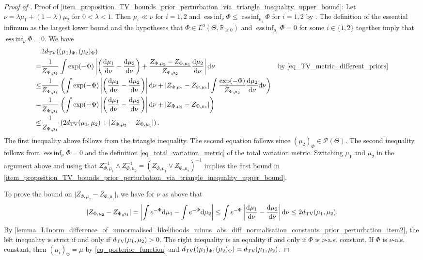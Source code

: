 \documentclass[a4paper]{scrartcl}
\theoremstyle{definition}
\numberwithin{equation}{section}
\newcommand{\R}{\mathbb{R}}
\newcommand{\rd}{\mathrm{d}}
\DeclareMathOperator*{\essinf}{ess\,inf}
\newcommand{\abs}[1]{\vert #1\vert}
\newcommand{\Abs}[1]{\left\vert#1\right\vert}
\newcommand{\TV}[0]{\textup{TV}}
\begin{document}
\begin{proof}[Proof of ]
 Proof of \cref{item_proposition_TV_bounds_prior_perturbation_via_triangle_inequality_upper_bound}: 
 Let $\nu=\lambda \mu_1+(1-\lambda)\mu_2$ for $0<\lambda <1$. Then $\mu_i\ll\nu$ for $i=1,2$ and $\essinf_\nu\Phi\leq \essinf_{\mu_i}\Phi$ for $i=1,2$ by .
 The definition of the essential infimum as the largest lower bound and the hypotheses that $\Phi\in L^0(\Theta,\R_{\geq 0})$ and $\essinf_{\mu_i}\Phi=0$ for some $i\in\{1,2\}$ together imply that $\essinf_\nu \Phi=0$.
 We have
\begin{align*}
  &2d_{\TV}((\mu_1)_\Phi,(\mu_2)_\Phi)
 \\
 =& \frac{1}{Z_{\Phi,\mu_1}}\int \exp(-\Phi) \Abs{ \left(\frac{\rd \mu_1}{\rd \nu}-\frac{\rd \mu_2}{\rd \nu}\right)+\frac{Z_{\Phi,\mu_2}-Z_{\Phi,\mu_1}}{Z_{\Phi,\mu_2}} \frac{\rd \mu_2}{\rd \nu}}\rd \nu  & \text{by \eqref{eq_TV_metric_different_priors}}
 \\
 \leq & \frac{1}{Z_{\Phi,\mu_1}}\left(\int \exp(-\Phi) \Abs{ \left(\frac{\rd \mu_1}{\rd \nu}-\frac{\rd \mu_2}{\rd \nu}\right)}\rd \nu
+\abs{Z_{\Phi,\mu_2}-Z_{\Phi,\mu_1}} \int \frac{\exp(-\Phi)}{Z_{\Phi,\mu_2}} \frac{\rd \mu_2}{\rd \nu}\rd \nu  \right)
 \\
 =& \frac{1}{Z_{\Phi,\mu_1}}\left(\int \exp(-\Phi) \Abs{ \left(\frac{\rd \mu_1}{\rd \nu}-\frac{\rd \mu_2}{\rd \nu}\right)}\rd \nu
+\abs{Z_{\Phi,\mu_2}-Z_{\Phi,\mu_1}} \right) 
\\
 \leq &\frac{1}{Z_{\Phi,\mu_1}}\left(2d_{\TV}(\mu_1,\mu_2)
+\abs{Z_{\Phi,\mu_2}-Z_{\Phi,\mu_1}} \right).
\end{align*}
 The first inequality above follows from the triangle inequality. 
 The second equation follows since $(\mu_2)_\Phi\in\mathcal{P}(\Theta)$.
 The second inequality follows from $\essinf_\nu\Phi=0$ and the definition \eqref{eq_total_variation_metric} of the total variation metric.
 Switching $\mu_1$ and $\mu_2$ in the argument above and using that $Z_{\Phi,\mu_1}^{-1}\wedge Z_{\Phi,\mu_2}^{-1}=(Z_{\Phi,\mu_1}\vee Z_{\Phi,\mu_2})^{-1}$ implies the first bound in \cref{item_proposition_TV_bounds_prior_perturbation_via_triangle_inequality_upper_bound}.
 
To prove the bound on $\abs{Z_{\Phi,\mu_2}-Z_{\Phi,\mu_1}}$, we have for $\nu$ as above that
 \begin{equation*}
  \abs{Z_{\Phi,\mu_2}-Z_{\Phi,\mu_1}}=\Abs{\int e^{-\Phi}\rd \mu_1-\int e^{-\Phi}\rd \mu_2 }\leq \int e^{-\Phi} \Abs{ \frac{\rd \mu_1}{\rd \nu}-\frac{\rd \mu_2}{\rd \nu}}\rd\nu\leq 2d_{\TV}(\mu_1,\mu_2).
 \end{equation*}
 By \ref{lemma_L1norm_difference_of_unnormalised_likelihoods_minus_abs_diff_normalisation_constants_prior_perturbation_item2}, the left inequality is strict if and only if $d_{\TV}(\mu_1,\mu_2)>0$. 
 The right inequality is an equality if and only if $\Phi$ is $\nu$-a.s. constant.
 If $\Phi$ is $\nu$-a.s. constant, then $(\mu_i)_\Phi=\mu$ by \eqref{eq_posterior_function} and $d_{\TV}((\mu_1)_\Phi,(\mu_2)_\Phi)= d_{\TV}(\mu_1,\mu_2)$.
 

\end{proof}
\end{document}
